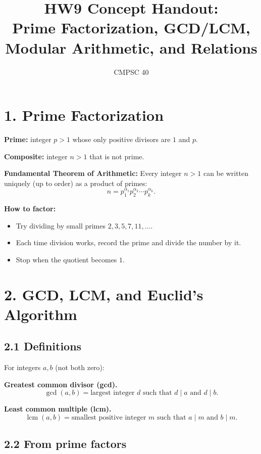 \documentclass[11pt]{article}
\begin{document}
\title{HW9 Concept Handout:\\
Prime Factorization, GCD/LCM, Modular Arithmetic, and Relations}
\author{CMPSC 40}
\date{}
\maketitle

\section*{1. Prime Factorization}

\textbf{Prime:} integer $p>1$ whose only positive divisors are $1$ and $p$.  

\textbf{Composite:} integer $n>1$ that is not prime.

\medskip
\textbf{Fundamental Theorem of Arithmetic:}  
Every integer $n>1$ can be written uniquely (up to order) as a product of primes:
\[
n = p_1^{\alpha_1} p_2^{\alpha_2}\cdots p_k^{\alpha_k}.
\]

\textbf{How to factor:}
\begin{itemize}
  \item Try dividing by small primes $2,3,5,7,11,\dots$.
  \item Each time division works, record the prime and divide the number by it.
  \item Stop when the quotient becomes $1$.
\end{itemize}

\section*{2. GCD, LCM, and Euclid's Algorithm}

\subsection*{2.1 Definitions}

For integers $a,b$ (not both zero):

\textbf{Greatest common divisor (gcd).}
\[
\gcd(a,b) = \text{largest integer $d$ such that } d\mid a \text{ and } d\mid b.
\]

\textbf{Least common multiple (lcm).}
\[
\operatorname{lcm}(a,b) = \text{smallest positive integer $m$ such that } a\mid m \text{ and } b\mid m.
\]

\subsection*{2.2 From prime factors}
\end{document}
